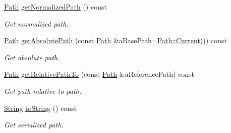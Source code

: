 \begin{DoxyCompactItemize}
\hyperlink{classostk_1_1core_1_1fs_1_1_path}{Path} \hyperlink{classostk_1_1core_1_1fs_1_1_path_a1bb35ee0009ce8174bfedb940232fe98}{get\+Normalized\+Path} () const
\begin{DoxyCompactList}\small\item\em Get normalized path. \end{DoxyCompactList}\item 
\hyperlink{classostk_1_1core_1_1fs_1_1_path}{Path} \hyperlink{classostk_1_1core_1_1fs_1_1_path_a03811029482b35c0aca0a23316d55b91}{get\+Absolute\+Path} (const \hyperlink{classostk_1_1core_1_1fs_1_1_path}{Path} \&a\+Base\+Path=\hyperlink{classostk_1_1core_1_1fs_1_1_path_a6a8f1a3d8a52c0dd4fd885ed4dae351a}{Path\+::\+Current}()) const
\begin{DoxyCompactList}\small\item\em Get absolute path. \end{DoxyCompactList}\item 
\hyperlink{classostk_1_1core_1_1fs_1_1_path}{Path} \hyperlink{classostk_1_1core_1_1fs_1_1_path_a171f914ecfcdeaf6a5b1f86bf9d49d4e}{get\+Relative\+Path\+To} (const \hyperlink{classostk_1_1core_1_1fs_1_1_path}{Path} \&a\+Reference\+Path) const
\begin{DoxyCompactList}\small\item\em Get path relative to path. \end{DoxyCompactList}\item 
\hyperlink{classostk_1_1core_1_1types_1_1_string}{String} \hyperlink{classostk_1_1core_1_1fs_1_1_path_a6153c19e534373b653c3f68b4750f970}{to\+String} () const
\begin{DoxyCompactList}\small\item\em Get serialized path. \end{DoxyCompactList}\end{DoxyCompactItemize}
